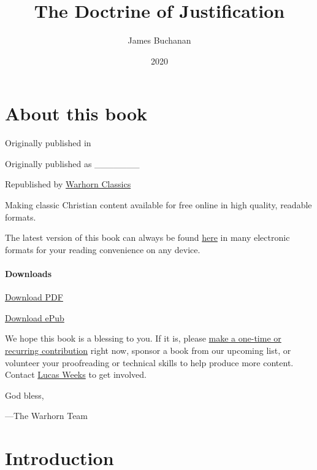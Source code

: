 \documentclass[
]{book}
\title{The Doctrine of Justification}
\author{James Buchanan}
\date{2020}
\begin{document}
\maketitle

\mainmatter
{}

{
\setcounter{tocdepth}{1}
\tableofcontents
}
\hypertarget{about-this-book}{%
\chapter*{About this book}\label{about-this-book}}

Originally published in

Originally published as \_\_\_\_\_\_\_

Republished by \href{https://classics.warhornmedia.com/}{Warhorn Classics}

Making classic Christian content available for free online in high quality, readable formats.

The latest version of this book can always be found \href{https://warhornmedia.github.io/warhorn-classics-book-template/}{here} in many electronic formats for your reading convenience on any device.

\hypertarget{downloads}{%
\subsubsection*{Downloads}\label{downloads}}

\href{https://warhornmedia.github.io/warhorn-classics-book-template//Buchanan-The_Doctrine_of_Justification.pdf}{Download PDF}

\href{https://warhornmedia.github.io/warhorn-classics-book-template//Buchanan-The_Doctrine_of_Justification.epub}{Download ePub}

We hope this book is a blessing to you. If it is, please \href{https://warhornmedia.com/give}{make a one-time or recurring contribution} right now, sponsor a book from our upcoming list, or volunteer your proofreading or technical skills to help produce more content. Contact \href{mailto:lucas@beggarsborn.com}{Lucas Weeks} to get involved.

God bless,

---The Warhorn Team

\clearpage
\setcounter{page}{1}

\hypertarget{introduction}{%
\chapter{Introduction}\label{introduction}}
\end{document}
